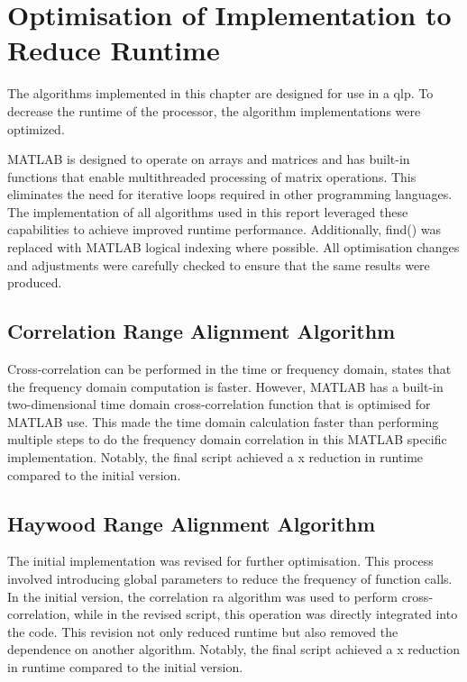\documentclass[class=report,11pt,crop=false]{standalone}
\begin{document}
\section{Optimisation of Implementation to Reduce Runtime \label{sec:V&V_optimisation}}
The algorithms implemented in this chapter are designed for use in a \gls{qlp}. To decrease the runtime of the processor, the algorithm implementations were optimized.

\textsc{MATLAB} is designed to operate on arrays and matrices and has built-in functions that enable multithreaded processing of matrix operations. This eliminates the need for iterative loops required in other programming languages. The implementation of all algorithms used in this report leveraged these capabilities to achieve improved runtime performance.  Additionally, find() was replaced with \textsc{MATLAB} logical indexing \cite{MATLAB_logical_indexing} where possible. All optimisation changes and adjustments were carefully checked to ensure that the same results were produced. 

    \subsection{Correlation Range Alignment Algorithm}
    Cross-correlation can be performed in the time or frequency domain, \cite{ISARtextbook_Martorella} states that the frequency domain computation is faster. However, \textsc{MATLAB} has a built-in two-dimensional time domain cross-correlation function that is optimised for \textsc{MATLAB} use. This made the time domain calculation faster than performing multiple steps to do the frequency domain correlation in this \textsc{MATLAB} specific implementation. Notably, the final script achieved a x reduction in runtime compared to the initial version.
    
    \subsection{Haywood Range Alignment Algorithm}
    The initial implementation was revised for further optimisation. This process involved introducing global parameters to reduce the frequency of function calls.  In the initial version, the correlation \gls{ra} algorithm was used to perform cross-correlation, while in the revised script, this operation was directly integrated into the code. This revision not only reduced runtime but also removed the dependence on another algorithm. Notably, the final script achieved a x reduction in runtime compared to the initial version.
    
\end{document}
